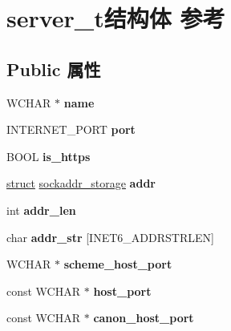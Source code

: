 \hypertarget{structserver__t}{}\section{server\+\_\+t结构体 参考}
\label{structserver__t}
\subsection*{Public 属性}
\begin{DoxyCompactItemize}
\item 
\mbox{\label{structserver__t_a444c052ae5d5a052cf3a59fe7a1b9e10}} 
W\+C\+H\+AR $\ast$ {\bfseries name}
\item 
\mbox{\label{structserver__t_acc8a8ac70be4561d006a4c6cc26a8ea6}} 
I\+N\+T\+E\+R\+N\+E\+T\+\_\+\+P\+O\+RT {\bfseries port}
\item 
\mbox{\label{structserver__t_aa91a3ac46b864ed76018cd38d881b478}} 
B\+O\+OL {\bfseries is\+\_\+https}
\item 
\mbox{\label{structserver__t_a45711229dbb2e3dc07f3a0783a81046e}} 
\hyperlink{interfacestruct}{struct} \hyperlink{structsockaddr__storage}{sockaddr\+\_\+storage} {\bfseries addr}
\item 
\mbox{\label{structserver__t_a6a930137771c59ab99c8569c9bd1acc1}} 
int {\bfseries addr\+\_\+len}
\item 
\mbox{\label{structserver__t_acbc4c563e585f0432f34c2f53f8e1f0c}} 
char {\bfseries addr\+\_\+str} \mbox{[}I\+N\+E\+T6\+\_\+\+A\+D\+D\+R\+S\+T\+R\+L\+EN\mbox{]}
\item 
\mbox{\label{structserver__t_a5e4448fc13863aad13cf7d142585b3e3}} 
W\+C\+H\+AR $\ast$ {\bfseries scheme\+\_\+host\+\_\+port}
\item 
\mbox{\label{structserver__t_acaaba5a7f97c6d60b0fe30b974252267}} 
const W\+C\+H\+AR $\ast$ {\bfseries host\+\_\+port}
\item 
\mbox{\label{structserver__t_a279da9aef2454792566f423b0293baec}} 
const W\+C\+H\+AR $\ast$ {\bfseries canon\+\_\+host\+\_\+port}

\end{DoxyCompactItemize}
